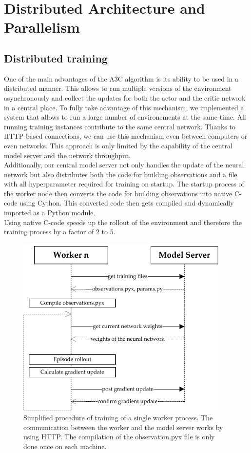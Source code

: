 \section{Distributed Architecture and Parallelism}\label{dist_architecture}
\subsection*{Distributed training}
One of the main advantages of the A3C algorithm is its ability to be used in a distributed manner. This allows to run multiple versions of the environment asynchronously and collect the updates for both the actor and the critic network in a central place. To fully take advantage of this mechanism, we implemented a system that allows to run a large number of environements at the same time. All running training instances contribute to the same central network. Thanks to HTTP-based connections, we can use this mechanism even between computers or even networks. This approach is only limited by the capability of the central model server and the network throughput.\\
Additionally, our central model server not only handles the update of the neural network but also distributes both the code for building observations and a file with all hyperparameter required for training on startup. The startup process of the worker node then converts the code for building observations into native C-code using Cython. This converted code then gets compiled and dynamically imported as a Python module.\\
Using native C-code speeds up the rollout of the environment and therefore the training process by a factor of 2 to 5.
\begin{figure}[H]
	\centering
	\includegraphics[width=300pt]{diagrams/distributed_training_update.pdf}
	\caption{Simplified procedure of training of a single worker process. The communication between the worker and the model server works by using HTTP. The compilation of the observation.pyx file is only done once on each machine.}
	\label{obs_descr}
\end{figure}
